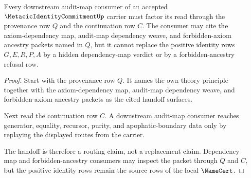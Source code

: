 \begin{theorem}
\label{thm:metacic-identity-commitment-audit-map-handoff}
Every downstream audit-map consumer of an accepted $\MetacicIdentityCommitmentUp$ carrier must factor its read through the provenance row $Q$ and the continuation row $C$. The consumer may cite the axiom-dependency map, audit-map dependency weave, and forbidden-axiom ancestry packets named in $Q$, but it cannot replace the positive identity rows $G,E,R,P,A$ by a hidden dependency-map verdict or by a forbidden-ancestry refusal row.
\end{theorem}
\begin{proof}
Start with the provenance row $Q$. It names the own-theory principle together with the axiom-dependency map, audit-map dependency weave, and forbidden-axiom ancestry packets as the cited handoff surfaces.

Next read the continuation row $C$. A downstream audit-map consumer reaches generator, equality, recursor, purity, and apophatic-boundary data only by replaying the displayed routes from the carrier.

The handoff is therefore a routing claim, not a replacement claim. Dependency-map and forbidden-ancestry consumers may inspect the packet through $Q$ and $C$, but the positive identity rows remain the source rows of the local $\NameCert$.
\end{proof}


\begin{closurestatus}{\MetacicIdentityCommitmentUp}
  \theoryclosure{\seedClosure}
  \formalstatus{\unformalizedV}
\end{closurestatus}
